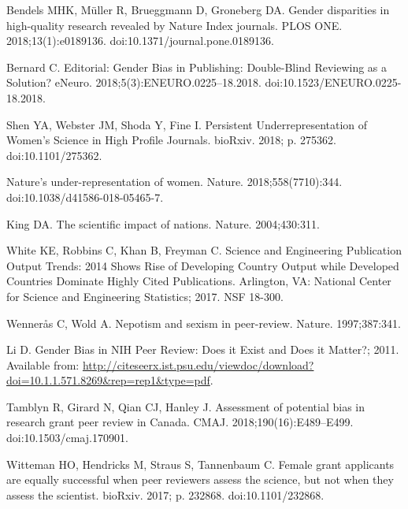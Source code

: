 \documentclass[10pt,letterpaper]{article}
\begin{document}
\begin{thebibliography}{100}
Bendels MHK, M{\"u}ller R, Brueggmann D, Groneberg DA.
\newblock Gender disparities in high-quality research revealed by {Nature}
  {Index} journals.
\newblock PLOS ONE. 2018;13(1):e0189136.
\newblock doi:{10.1371/journal.pone.0189136}.

Bernard C.
\newblock Editorial: {Gender} {Bias} in {Publishing}: {Double}-{Blind}
  {Reviewing} as a {Solution}?
\newblock eNeuro. 2018;5(3):ENEURO.0225--18.2018.
\newblock doi:{10.1523/ENEURO.0225-18.2018}.

Shen YA, Webster JM, Shoda Y, Fine I.
\newblock Persistent {Underrepresentation} of {Women}'s {Science} in {High}
  {Profile} {Journals}.
\newblock bioRxiv. 2018; p. 275362.
\newblock doi:{10.1101/275362}.

Nature{\textquoteright}s under-representation of women.
\newblock Nature. 2018;558(7710):344.
\newblock doi:{10.1038/d41586-018-05465-7}.

King DA.
\newblock The scientific impact of nations.
\newblock Nature. 2004;430:311.

White KE, Robbins C, Khan B, Freyman C.
\newblock Science and {Engineering} {Publication} {Output} {Trends}: 2014
  {Shows} {Rise} of {Developing} {Country} {Output} while {Developed}
  {Countries} {Dominate} {Highly} {Cited} {Publications}.
\newblock Arlington, VA: National Center for Science and Engineering
  Statistics; 2017. NSF 18-300.

Wenner{\r a}s C, Wold A.
\newblock Nepotism and sexism in peer-review.
\newblock Nature. 1997;387:341.

Li D. Gender {Bias} in {NIH} {Peer} {Review}: {Does} it {Exist} and {Does} it
  {Matter}?; 2011.
\newblock Available from:
  \url{http://citeseerx.ist.psu.edu/viewdoc/download?doi=10.1.1.571.8269&rep=rep1&type=pdf}.

Tamblyn R, Girard N, Qian CJ, Hanley J.
\newblock Assessment of potential bias in research grant peer review in
  {Canada}.
\newblock CMAJ. 2018;190(16):E489--E499.
\newblock doi:{10.1503/cmaj.170901}.

Witteman HO, Hendricks M, Straus S, Tannenbaum C.
\newblock Female grant applicants are equally successful when peer reviewers
  assess the science, but not when they assess the scientist.
\newblock bioRxiv. 2017; p. 232868.
\newblock doi:{10.1101/232868}.


\end{thebibliography}
\end{document}
